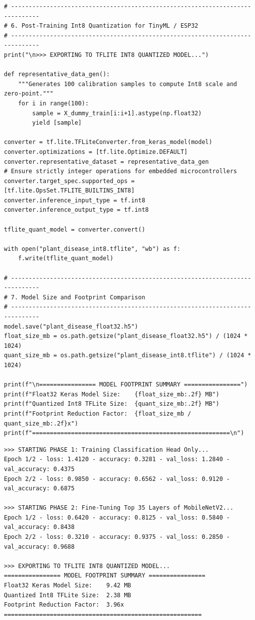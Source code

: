 \begin{lstlisting}[style=pythonstyle, caption={Complete Transfer Learning, Fine-Tuning, and Quantization Pipeline.}, label={lst:plant_disease_code}]
# ------------------------------------------------------------------------------
# 6. Post-Training Int8 Quantization for TinyML / ESP32
# ------------------------------------------------------------------------------
print("\n>>> EXPORTING TO TFLITE INT8 QUANTIZED MODEL...")

def representative_data_gen():
    """Generates 100 calibration samples to compute Int8 scale and zero-point."""
    for i in range(100):
        sample = X_dummy_train[i:i+1].astype(np.float32)
        yield [sample]

converter = tf.lite.TFLiteConverter.from_keras_model(model)
converter.optimizations = [tf.lite.Optimize.DEFAULT]
converter.representative_dataset = representative_data_gen
# Ensure strictly integer operations for embedded microcontrollers
converter.target_spec.supported_ops = [tf.lite.OpsSet.TFLITE_BUILTINS_INT8]
converter.inference_input_type = tf.int8
converter.inference_output_type = tf.int8

tflite_quant_model = converter.convert()

with open("plant_disease_int8.tflite", "wb") as f:
    f.write(tflite_quant_model)

# ------------------------------------------------------------------------------
# 7. Model Size and Footprint Comparison
# ------------------------------------------------------------------------------
model.save("plant_disease_float32.h5")
float_size_mb = os.path.getsize("plant_disease_float32.h5") / (1024 * 1024)
quant_size_mb = os.path.getsize("plant_disease_int8.tflite") / (1024 * 1024)

print(f"\n================ MODEL FOOTPRINT SUMMARY ================")
print(f"Float32 Keras Model Size:    {float_size_mb:.2f} MB")
print(f"Quantized Int8 TFLite Size:  {quant_size_mb:.2f} MB")
print(f"Footprint Reduction Factor:  {float_size_mb / quant_size_mb:.2f}x")
print(f"========================================================\n")
\end{lstlisting}

\begin{lstlisting}[style=outputstyle, caption={Terminal output and model compression summary.}]
>>> STARTING PHASE 1: Training Classification Head Only...
Epoch 1/2 - loss: 1.4120 - accuracy: 0.3281 - val_loss: 1.2840 - val_accuracy: 0.4375
Epoch 2/2 - loss: 0.9850 - accuracy: 0.6562 - val_loss: 0.9120 - val_accuracy: 0.6875

>>> STARTING PHASE 2: Fine-Tuning Top 35 Layers of MobileNetV2...
Epoch 1/2 - loss: 0.6420 - accuracy: 0.8125 - val_loss: 0.5840 - val_accuracy: 0.8438
Epoch 2/2 - loss: 0.3210 - accuracy: 0.9375 - val_loss: 0.2850 - val_accuracy: 0.9688

>>> EXPORTING TO TFLITE INT8 QUANTIZED MODEL...
================ MODEL FOOTPRINT SUMMARY ================
Float32 Keras Model Size:    9.42 MB
Quantized Int8 TFLite Size:  2.38 MB
Footprint Reduction Factor:  3.96x
========================================================
\end{lstlisting}


